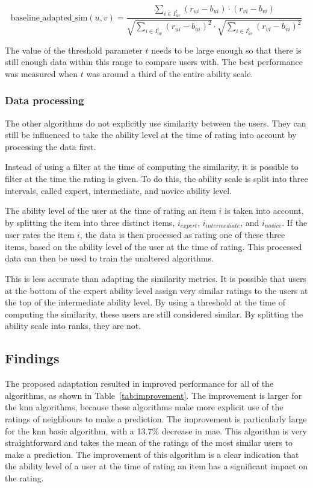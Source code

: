 \begin{equation}
  \label{eq:baseline-adapted}
        \text{baseline\_adapted\_sim}(u, v) = \frac{
            \sum\limits_{i \in I_{uv}^t} (r_{ui} -  b_{ui}) \cdot (r_{vi} -
            b_{vi})} {\sqrt{\sum\limits_{i \in I_{uv}^t} (r_{ui} -  b_{ui})^2}
            \cdot \sqrt{\sum\limits_{i \in I_{uv}^t} (r_{vi} -  b_{vi})^2}}
\end{equation}

The value of the threshold parameter $t$ needs to be large enough so that there is still enough data within this range to compare users with.
The best performance was measured when $t$ was around a third of the entire ability scale.

\subsubsection{Data processing}
The other algorithms do not explicitly use similarity between the users.
They can still be influenced to take the ability level at the time of rating into account by processing the data first.

Instead of using a filter at the time of computing the similarity, it is possible to filter at the time the rating is given.
To do this, the ability scale is split into three intervals, called expert, intermediate, and novice ability level.

The ability level of the user at the time of rating an item $i$ is taken into account, by splitting the item into three distinct items, $i_{expert}$, $i_{intermediate}$, and $i_{novice}$.
If the user rates the item $i$, the data is then processed as rating one of these three items, based on the ability level of the user at the time of rating.
This processed data can then be used to train the unaltered algorithms.

This is less accurate than adapting the similarity metrics. It is possible that users at the bottom of the expert ability level assign very similar ratings to the users at the top of the intermediate ability level. 
By using a threshold at the time of computing the similarity, these users are still considered similar.
By splitting the ability scale into ranks, they are not.

\subsection{Findings}
The proposed adaptation resulted in improved performance for all of the algorithms, as shown in Table~\ref{tab:improvement}.
The improvement is larger for the \gls{knn} algorithms, because these algorithms make more explicit use of the ratings of neighbours to make a prediction.
The improvement is particularly large for the \gls{knn} basic algorithm, with a 13.7\% decrease in \gls{mae}.
This algorithm is very straightforward and takes the mean of the ratings of the most similar users to make a prediction.
The improvement of this algorithm is a clear indication that the ability level of a user at the time of rating an item has a significant impact on the rating.

